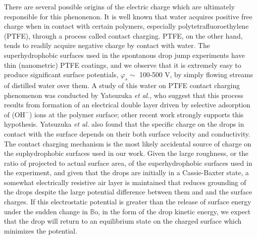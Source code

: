 \documentclass[12pt,a4paper,oneside]{book}
\begin{document}
There are several possible origins of the electric charge which are ultimately responsible for this phenonenon. It is well known that water acquires positive free charge when in contact with certain polymers, especially polytetrafluoroethylene (PTFE)\cite{langmuir_surface_1938}, through a process called contact charging. PTFE, on the other hand, tends to readily acquire negative charge by contact with water. The superhydrophobic surfaces used in the spontanous drop jump experiments have thin (nanometric) PTFE coatings, and we observe that it is extremely easy to produce significant surface potentials, $\varphi_s \sim$ 100-500 V, by simply flowing streams of distilled water over them. A study of this water on PTFE contact charging phenomenon was conducted by Yatsuzuka \emph{et al.}\cite{yatsuzuka_electrification_1994}, who suggest that this process results from formation of an electrical double layer driven by selective adsorption of ($\mbox{OH}^-$) ions at the polymer surface; other recent work strongly supports this hypothesis\cite{beattie_intrinsic_2006}\cite{strazdaite_water_2015}. Yatsuzuka \emph{et al.} also found that the specific charge on the drops in contact with the surface depends on their both surface velocity and conductivity. The contact charging mechanism is the most likely accidental source of charge on the suphydrophobic surfaces used in our work. Given the large roughness, or the ratio of projected to actual surface area, of the superhydrophobic surfaces used in the experiment, and given that the drops are initially in a Cassie-Baxter state, a somewhat electrically resistive air layer is maintained that reduces grounding of the drops despite the large potential difference between them and and the surface charges. If this electrostatic potential is greater than the release of surface energy under the sudden change in $\mathbb{B}\mbox{o}$, in the form of the drop kinetic energy, we expect that the drop will return to an equilibrium state on the charged surface which minimizes the potential.
\end{document}
